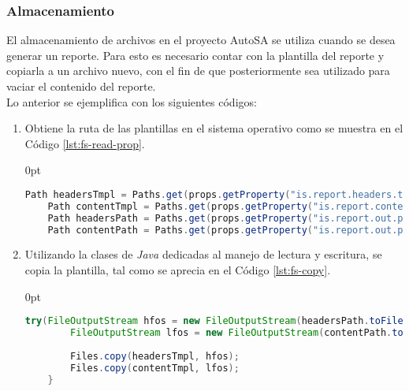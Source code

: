 \subsubsection{Almacenamiento}
El almacenamiento de archivos en el proyecto AutoSA se utiliza cuando se desea generar un reporte. Para esto es necesario contar con la plantilla del reporte y copiarla a un archivo nuevo, con el fin de que posteriormente sea utilizado para vaciar el contenido del reporte.\\
Lo anterior se ejemplifica con los siguientes códigos:
\begin{enumerate}
	\item Obtiene la ruta de las plantillas en el sistema operativo como se muestra en el Código \ref{lst:fs-read-prop}.
	\begin{adjustwidth}{\listingfixwidth}{0pt}
	\begin{lstlisting}[language=Java, caption={Obtención de las rutas de las plantillas.}, captionpos=b, label={lst:fs-read-prop}]
	Path headersTmpl = Paths.get(props.getProperty("is.report.headers.tmpl"));
	Path contentTmpl = Paths.get(props.getProperty("is.report.content.tmpl"));
	Path headersPath = Paths.get(props.getProperty("is.report.out.path"), headersTmpl.getFileName().toString());
	Path contentPath = Paths.get(props.getProperty("is.report.out.path"), contentTmpl.getFileName().toString());
	\end{lstlisting}
	\end{adjustwidth}

	\item Utilizando la clases de \textit{Java} dedicadas al manejo de lectura y escritura, se copia la plantilla, tal como se aprecia en el Código \ref{lst:fs-copy}.

\pagebreak
	
	\begin{adjustwidth}{\listingfixwidth}{0pt}
	\begin{lstlisting}[language=Java, caption={Copia de archivos.}, captionpos=b, label={lst:fs-copy}]
	try(FileOutputStream hfos = new FileOutputStream(headersPath.toFile(), false);
		FileOutputStream lfos = new FileOutputStream(contentPath.toFile(), false)){
		
		Files.copy(headersTmpl, hfos);
		Files.copy(contentTmpl, lfos);
	}
	\end{lstlisting}
	\end{adjustwidth}
\end{enumerate}

